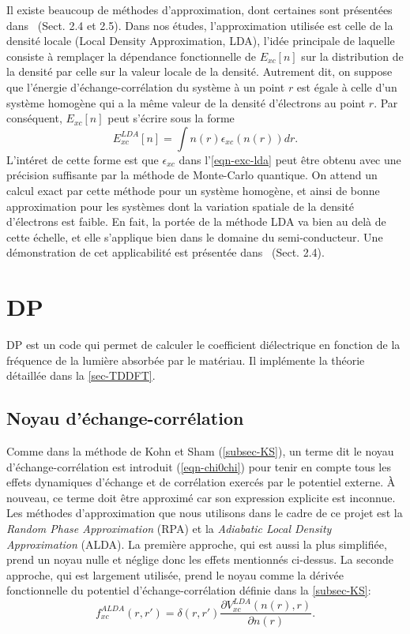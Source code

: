 Il existe beaucoup de méthodes d'approximation,
dont certaines sont présentées dans~\cite{Sot03} (Sect. 2.4 et 2.5).
Dans nos études, l'approximation utilisée est celle de la densité locale (Local Density Approximation, LDA),
l'idée principale de laquelle consiste à remplaçer la dépendance fonctionnelle de $E_{xc}[n]$
sur la distribution de la densité par celle sur la valeur locale de la densité.
Autrement dit, on suppose que l'énergie d'échange-corrélation du système à un point $r$
est égale à celle d'un système homogène qui a la même valeur de la densité d'électrons au point $r$.
Par conséquent, $E_{xc}[n]$ peut s'écrire sous la forme
\begin{equation}
  \label{eqn-exc-lda}
  E_{xc}^{LDA}[n] = \int n(r)\epsilon_{xc}(n(r)) dr.
\end{equation}
L'intéret de cette forme est que $\epsilon_{xc}$ dans l'\cref{eqn-exc-lda} peut être obtenu avec
une précision suffisante par la méthode de Monte-Carlo quantique.
On attend un calcul exact par cette méthode pour un système homogène,
et ainsi de bonne approximation pour les systèmes dont la variation spatiale de la densité d'électrons est faible.
En fait, la portée de la méthode LDA va bien au delà de cette échelle,
et elle s'applique bien dans le domaine du semi-conducteur.
Une démonstration de cet applicabilité est présentée dans~\cite{Sot03} (Sect. 2.4).

\section{DP}
DP est un code qui permet de calculer le coefficient diélectrique
en fonction de la fréquence de la lumière absorbée par le matériau.
Il implémente la théorie détaillée dans la \cref{sec-TDDFT}.

\subsection{Noyau d'échange-corrélation}
Comme dans la méthode de Kohn et Sham (\cref{subsec-KS}),
un terme dit le noyau d'échange-corrélation est introduit (\cref{eqn-chi0chi})
pour tenir en compte tous les effets dynamiques d'échange et de corrélation
exercés par le potentiel externe.
À nouveau, ce terme doit être approximé car son expression explicite est inconnue.
Les méthodes d'approximation que nous utilisons dans le cadre de ce projet est
la \textit{Random Phase Approximation} (RPA) et
la \textit{Adiabatic Local Density Approximation} (ALDA).
La première approche, qui est aussi la plus simplifiée, prend un noyau nulle et
néglige donc les effets mentionnés ci-dessus.
La seconde approche, qui est largement utilisée,
prend le noyau comme la dérivée fonctionnelle du potentiel d'échange-corrélation
définie dans la \cref{subsec-KS}:
\begin{equation}
  f_{xc}^{ALDA}(r, r') = \delta(r, r')\frac{\partial V_{xc}^{LDA}(n(r), r)}{\partial n(r)}.
\end{equation}

